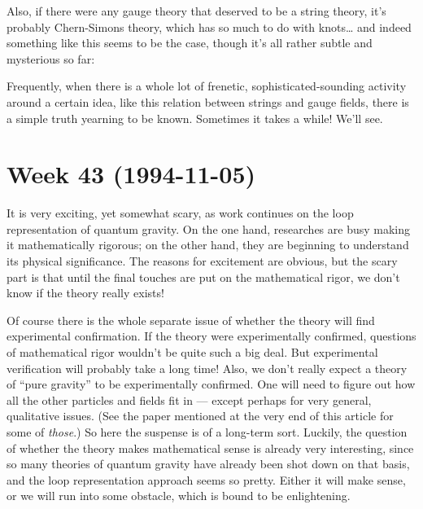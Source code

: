 \documentclass{article}
\def\tightlist{}
\renewcommand{\texttt}[1]{%
  \begingroup
  \ttfamily
  \begingroup\lccode`~=`/\lowercase{\endgroup\def~}{/\discretionary{}{}{}}%
  \begingroup\lccode`~=`[\lowercase{\endgroup\def~}{[\discretionary{}{}{}}%
  \begingroup\lccode`~=`.\lowercase{\endgroup\def~}{.\discretionary{}{}{}}%
  \catcode`/=\active\catcode`[=\active\catcode`.=\active
  \scantokens{#1\noexpand}%
  \endgroup
}
\begin{document}
Also, if there were any gauge theory that deserved to be a string
theory, it's probably Chern-Simons theory, which has so much to do with
knots\ldots{} and indeed something like this seems to be the case,
though it's all rather subtle and mysterious so far:


Frequently, when there is a whole lot of frenetic,
sophisticated-sounding activity around a certain idea, like this
relation between strings and gauge fields, there is a simple truth
yearning to be known. Sometimes it takes a while! We'll see.
\hypertarget{week-43-1994-11-05}{%
\section{Week 43 (1994-11-05)}\label{week-43-1994-11-05}}

It is very exciting, yet somewhat scary, as work continues on the loop
representation of quantum gravity. On the one hand, researches are busy
making it mathematically rigorous; on the other hand, they are beginning
to understand its physical significance. The reasons for excitement are
obvious, but the scary part is that until the final touches are put on
the mathematical rigor, we don't know if the theory really exists!

Of course there is the whole separate issue of whether the theory will
find experimental confirmation. If the theory were experimentally
confirmed, questions of mathematical rigor wouldn't be quite such a big
deal. But experimental verification will probably take a long time!
Also, we don't really expect a theory of ``pure gravity'' to be
experimentally confirmed. One will need to figure out how all the other
particles and fields fit in --- except perhaps for very general,
qualitative issues. (See the paper mentioned at the very end of this
article for some of \emph{those}.) So here the suspense is of a
long-term sort. Luckily, the question of whether the theory makes
mathematical sense is already very interesting, since so many theories
of quantum gravity have already been shot down on that basis, and the
loop representation approach seems so pretty. Either it will make sense,
or we will run into some obstacle, which is bound to be enlightening.
\end{document}
